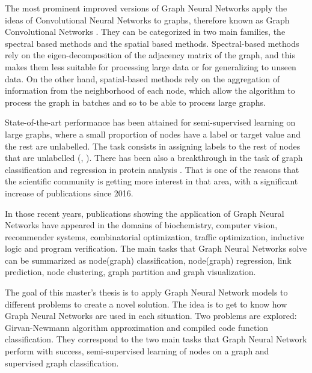 The most prominent improved versions of Graph Neural Networks apply the ideas of Convolutional Neural Networks to graphs, therefore known as Graph Convolutional Networks \cite{gcn}. They can be categorized in two main families, the spectral based methods and the spatial based methods. Spectral-based methods rely on the eigen-decomposition of the adjacency matrix of the graph, and this makes them less suitable for processing large data or for generalizing to unseen data. On the other hand, spatial-based methods rely on the aggregation of information from the neighborhood of each node, which allow the algorithm to process the graph in batches and so to be able to process large graphs.



State-of-the-art performance has been attained for semi-supervised learning on large graphs, where a small proportion of nodes have a label or target value and the rest are unlabelled. The task consists in assigning labels to the rest of nodes that are unlabelled (\cite{gcn}, \cite{graphsage}). There has been also a breakthrough in the task of graph classification and regression in protein analysis \cite{zhang2018end}. That is one of the reasons that the scientific community is getting more interest in that area, with a significant increase of publications since 2016.

In those recent years, publications showing the application of Graph Neural Networks have appeared in the domains of biochemistry, computer vision, recommender systems, combinatorial optimization, traffic optimization, inductive logic and program verification. The main tasks that Graph Neural Networks solve can be summarized as node(graph) classification, node(graph) regression, link prediction,  node clustering, graph partition and graph visualization.

	

The goal of this master's thesis is to apply Graph Neural Network models to different problems to create a novel solution. The idea is to get to know how Graph Neural Networks are used in each situation. Two problems are explored: Girvan-Newmann algorithm approximation and compiled code function classification. They correspond to the two main tasks that Graph Neural Network perform with success, semi-supervised learning of nodes on a graph and supervised graph classification. 



